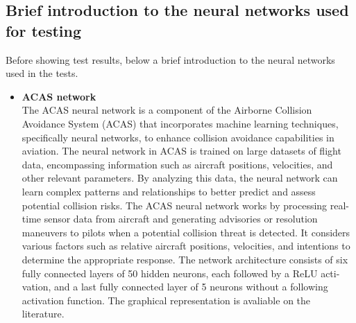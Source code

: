 \subsection{Brief introduction to the neural networks used for testing}
Before showing test results, below a brief introduction to the neural networks used in the tests.
\begin{itemize}
    \item \textbf{ACAS network}\\
    The ACAS neural network is a component of the Airborne Collision Avoidance System (ACAS) that incorporates machine learning techniques, specifically neural networks, to enhance collision avoidance capabilities in aviation.
    The neural network in ACAS is trained on large datasets of flight data, encompassing information such as aircraft positions, velocities, and other relevant parameters. By analyzing this data, 
    the neural network can learn complex patterns and relationships to better predict and assess potential collision risks.
    The ACAS neural network works by processing real-time sensor data from aircraft and generating advisories or resolution maneuvers to pilots when a potential collision threat is detected. 
    It considers various factors such as relative aircraft positions, velocities, and intentions to determine the appropriate response.
    The network architecture consists of six fully connected layers of 50 hidden neurons, each followed by a ReLU acti- vation, and a last fully connected layer of 5 neurons without a following activation function. The graphical
    representation is avaliable on the literature.


\end{itemize}
